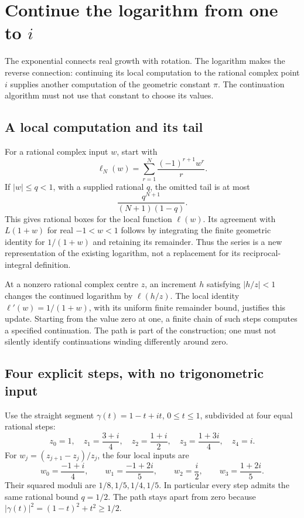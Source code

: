 \section{Continue the logarithm from one to $i$}
\label{sec:logarithm-continuation}

The exponential connects real growth with rotation. The logarithm makes the
reverse connection: continuing its local computation to the rational complex
point $i$ supplies another computation of the geometric constant $\pi$.
The continuation algorithm must not use that constant to choose its values.

\subsection{A local computation and its tail}
For a rational complex input $w$, start with
\[
 \ell_N(w)=\sum_{r=1}^N\frac{(-1)^{r+1}w^r}{r}.
\]
If $|w|\le q<1$, with a supplied rational $q$, the omitted tail is at most
\[
 \frac{q^{N+1}}{(N+1)(1-q)}.
\]
This gives rational boxes for the local function $\ell(w)$. Its agreement
with $L(1+w)$ for real $-1<w<1$ follows by integrating the finite geometric
identity for $1/(1+w)$ and retaining its remainder. Thus the series is a
new representation of the existing logarithm, not a replacement for its
reciprocal-integral definition.

At a nonzero rational complex centre $z$, an increment $h$ satisfying
$|h/z|<1$ changes the continued logarithm by $\ell(h/z)$. The local
identity $\ell'(w)=1/(1+w)$, with its uniform finite remainder bound,
justifies this update. Starting from the value zero at one, a finite chain
of such steps computes a specified continuation. The path is part of the
construction; one must not silently identify continuations winding differently
around zero.

\subsection{Four explicit steps, with no trigonometric input}
Use the straight segment $\gamma(t)=1-t+it$, $0\le t\le1$, subdivided at
four equal rational steps:
\[
 z_0=1,\quad z_1=\frac{3+i}{4},\quad z_2=\frac{1+i}{2},\quad
 z_3=\frac{1+3i}{4},\quad z_4=i.
\]
For $w_j=(z_{j+1}-z_j)/z_j$, the four local inputs are
\[
 w_0=\frac{-1+i}{4},\qquad
 w_1=\frac{-1+2i}{5},\qquad
 w_2=\frac{i}{2},\qquad
 w_3=\frac{1+2i}{5}.
\]
Their squared moduli are $1/8,1/5,1/4,1/5$. In particular every step admits
the same rational bound $q=1/2$. The path stays apart from zero because
$|\gamma(t)|^2=(1-t)^2+t^2\ge1/2$.

